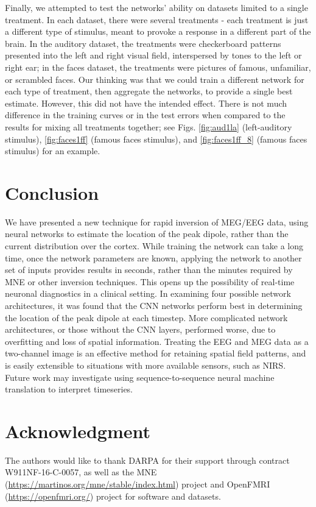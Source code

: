 \documentclass[journal,12pt,onecolumn,draftclsnofoot,]{IEEEtran}
\begin{document}
Finally, we attempted to test the networks' ability on datasets limited to a single treatment. In each dataset, there were several treatments - each treatment is just a different type of stimulus, meant to provoke a response in a different part of the brain. In the auditory dataset, the treatments were checkerboard patterns presented into the left and right visual field, interspersed by tones to the left or right ear; in the faces dataset, the treatments were pictures of famous, unfamiliar, or scrambled faces. Our thinking was that we could train a different network for each type of treatment, then aggregate the networks, to provide a single best estimate. However, this did not have the intended effect. There is not much difference in the training curves or in the test errors when compared to the results for mixing all treatments together; see Figs. \ref{fig:aud1la} (left-auditory stimulus), \ref{fig:faces1ff} (famous faces stimulus), and \ref{fig:faces1ff_8} (famous faces stimulus) for an example.


\section{Conclusion}
We have presented a new technique for rapid inversion of MEG/EEG data, using neural networks to estimate the location of the peak dipole, rather than the current distribution over the cortex. While training the network can take a long time, once the network parameters are known, applying the network to another set of inputs provides results in seconds, rather than the minutes required by MNE or other inversion techniques. This opens up the possibility of real-time neuronal diagnostics in a clinical setting. In examining four possible network architectures, it was found that the CNN networks perform best in determining the location of the peak dipole at each timestep. More complicated network architectures, or those without the CNN layers, performed worse, due to overfitting and loss of spatial information. Treating the EEG and MEG data as a two-channel image is an effective method for retaining spatial field patterns, and is easily extensible to situations with more available sensors, such as NIRS. Future work may investigate using sequence-to-sequence neural machine translation to interpret timeseries.


\section*{Acknowledgment}
The authors would like to thank DARPA for their support through contract W911NF-16-C-0057, as well as the MNE (\url{https://martinos.org/mne/stable/index.html}) project and OpenFMRI (\url{https://openfmri.org/}) project for software and datasets.
\end{document}

